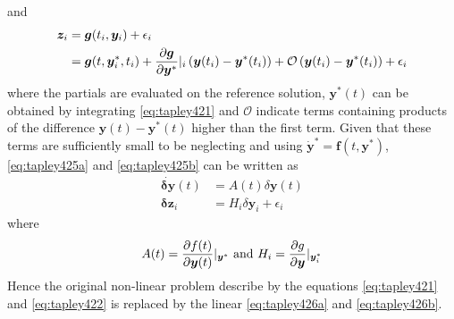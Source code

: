 and
\begin{equation}\label{eq:tapley425b}
  \begin{aligned}
  \bm{z}_i &= \bm{g}(t_i, \bm{y}_i) + \epsilon _i \\ 
           &= \bm{g}(t, \bm{y}^{*}_{i}, t_i) 
           + \frac{\partial \bm{g}}{\partial \bm{y}^{*}}|_{i} 
           \left( \bm{y}(t_i) - \bm{y}^{*}(t_i) \right) 
           + \mathcal{O}\left( \bm{y}(t_i) - \bm{y}^{*}(t_i) \right) 
           + \epsilon _i
  \end{aligned}
\end{equation}
where the partials are evaluated on the reference solution, $\bm{y}^{*}(t)$ can be 
obtained by integrating \autoref{eq:tapley421} and $\mathcal{O}$ indicate terms 
containing products of the difference $\bm{y}(t) - \bm{y}^{*}(t)$ higher than the 
first term. Given that these terms are sufficiently small to be neglecting and using 
$ \bm{\dot{y}}^{*} = \bm{f}(t, \bm{y}^{*})$, \autoref{eq:tapley425a} and 
\autoref{eq:tapley425b} can be written as
\begin{align}
  \dot{\bm{\delta y}}(t) &= A(t) \delta \bm{y}(t) \label{eq:tapley426a}\\
  \bm{\delta z}_i &= H_i \delta \bm{y}_i + \epsilon _i \label{eq:tapley426b}
\end{align}
where 
\begin{equation}\label{eq:tapley426c}
  A(t) = \frac{\partial f (t)}{\partial \bm{y}(t)}|_{\bm{y}^{*}} 
  \text{ and }
  H_i = \frac{\partial g}{\partial \bm{y}}|_{\bm{y}^{*}_i}
\end{equation}
Hence the original non-linear problem describe by the equations \autoref{eq:tapley421} 
and \autoref{eq:tapley422} is replaced by the linear \autoref{eq:tapley426a} and 
\autoref{eq:tapley426b}. 
